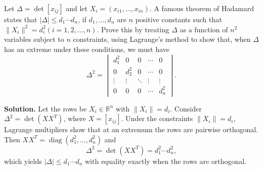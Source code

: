 \begin{problembox}
Let \(\Delta = \det [x_{ij}]\) and let \(X_i = (x_{i1}, \ldots, x_{in})\). A famous theorem of Hadamard states that \(|\Delta| \leq d_1 \cdots d_n\), if \(d_1, \ldots, d_n\) are \(n\) positive constants such that \(\| X_i \|^2 = d_i^2 (i = 1, 2, \ldots, n)\). Prove this by treating \(\Delta\) as a function of \(n^2\) variables subject to \(n\) constraints, using Lagrange's method to show that, when \(\Delta\) has an extreme under these conditions, we must have
\[\Delta^2 = 
\begin{vmatrix}
d_1^2 & 0 & 0 & \cdots & 0 \\
0 & d_2^2 & 0 & \cdots & 0 \\
\vdots & \vdots & \ddots & \vdots & \vdots \\
0 & 0 & 0 & \cdots & d_n^2
\end{vmatrix}.\]
\end{problembox}

\noindent\textbf{Solution.}
Let the rows be $X_i\in\mathbb R^n$ with $\|X_i\|=d_i$. Consider $\Delta^2=\det(XX^{\!T})$, where $X=[x_{ij}]$. Under the constraints $\|X_i\|=d_i$, Lagrange multipliers show that at an extremum the rows are pairwise orthogonal. Then $XX^{\!T}=\operatorname{diag}(d_1^2,\dots,d_n^2)$ and
\[\Delta^2=\det(XX^{\!T})=d_1^2\cdots d_n^2,\]
which yields $|\Delta|\le d_1\cdots d_n$ with equality exactly when the rows are orthogonal.